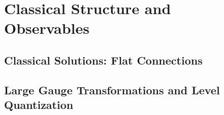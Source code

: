 %
%
%

\section{Classical Structure and Observables}


\subsection{Classical Solutions: Flat Connections}



\subsection{Large Gauge Transformations and Level Quantization}

%

